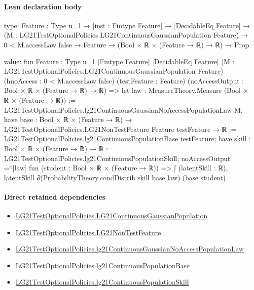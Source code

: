 \documentclass[10pt]{article}
\begin{document}
\paragraph{Lean declaration body}
\begin{ReviewVerbatim}
type:
{Feature : Type u_1} →
  [inst : Fintype Feature] →
    [DecidableEq Feature] →
      (M : LG21TestOptionalPolicies.LG21ContinuousGaussianPopulation Feature) →
        0 < M.accessLaw {false} → Feature → (Bool × ℝ × (Feature → ℝ) → ℝ) → Prop

value:
fun {Feature : Type u_1} [Fintype Feature] [DecidableEq Feature]
    (M : LG21TestOptionalPolicies.LG21ContinuousGaussianPopulation Feature) (hnoAccess : 0 < M.accessLaw {false})
    (testFeature : Feature) (noAccessOutput : Bool × ℝ × (Feature → ℝ) → ℝ) =>
  let law : MeasureTheory.Measure (Bool × ℝ × (Feature → ℝ)) :=
    LG21TestOptionalPolicies.lg21ContinuousGaussianNoAccessPopulationLaw M;
  have base : Bool × ℝ × (Feature → ℝ) → LG21TestOptionalPolicies.LG21NonTestFeature Feature testFeature → ℝ :=
    LG21TestOptionalPolicies.lg21ContinuousPopulationBase testFeature;
  have skill : Bool × ℝ × (Feature → ℝ) → ℝ := LG21TestOptionalPolicies.lg21ContinuousPopulationSkill;
  noAccessOutput =ᵐ[law] fun (student : Bool × ℝ × (Feature → ℝ)) =>
    ∫ (latentSkill : ℝ), latentSkill ∂(ProbabilityTheory.condDistrib skill base law) (base student)
\end{ReviewVerbatim}

\paragraph{Direct retained dependencies}
\begin{itemize}\raggedright
\item \hyperlink{paper-prerequisite-f5e1c886d250142b}{LG21\allowbreak{}Test\allowbreak{}Optional\allowbreak{}Policies.\allowbreak{}LG21\allowbreak{}Continuous\allowbreak{}Gaussian\allowbreak{}Population}
\item \hyperlink{governing-declaration-81cb73bf3869c56d}{LG21\allowbreak{}Test\allowbreak{}Optional\allowbreak{}Policies.\allowbreak{}LG21\allowbreak{}Non\allowbreak{}Test\allowbreak{}Feature}
\item \hyperlink{governing-declaration-cb63da3a1a7a6c13}{LG21\allowbreak{}Test\allowbreak{}Optional\allowbreak{}Policies.\allowbreak{}lg21\allowbreak{}Continuous\allowbreak{}Gaussian\allowbreak{}No\allowbreak{}Access\allowbreak{}Population\allowbreak{}Law}
\item \hyperlink{governing-declaration-3b5146b167dee236}{LG21\allowbreak{}Test\allowbreak{}Optional\allowbreak{}Policies.\allowbreak{}lg21\allowbreak{}Continuous\allowbreak{}Population\allowbreak{}Base}
\item \hyperlink{governing-declaration-339ce55dcb78dfb9}{LG21\allowbreak{}Test\allowbreak{}Optional\allowbreak{}Policies.\allowbreak{}lg21\allowbreak{}Continuous\allowbreak{}Population\allowbreak{}Skill}
\end{itemize}
\hypertarget{governing-declaration-18a34a17bc35164d}{}
\end{document}
